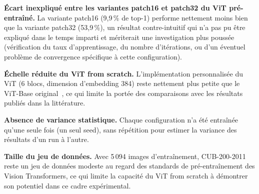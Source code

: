 \textbf{Écart inexpliqué entre les variantes patch16 et patch32 du ViT
pré-entraîné.} La variante patch16 (9{,}9\,\% de top-1) performe
nettement moins bien que la variante patch32 (53{,}9\,\%), un résultat
contre-intuitif qui n'a pas pu être expliqué dans le temps imparti et
mériterait une investigation plus poussée (vérification du taux
d'apprentissage, du nombre d'itérations, ou d'un éventuel problème de
convergence spécifique à cette configuration).

\textbf{Échelle réduite du ViT from scratch.} L'implémentation
personnalisée du ViT (6 blocs, dimension d'embedding 384) reste
nettement plus petite que le ViT-Base original~\cite{dosovitskiy2020vit},
ce qui limite la portée des comparaisons avec les résultats publiés
dans la littérature.

\textbf{Absence de variance statistique.} Chaque configuration n'a été
entraînée qu'une seule fois (un seul seed), sans répétition pour
estimer la variance des résultats d'un run à l'autre.

\textbf{Taille du jeu de données.} Avec 5\,094 images d'entraînement,
CUB-200-2011 reste un jeu de données modeste au regard des standards
de pré-entraînement des Vision Transformers, ce qui limite la capacité
du ViT from scratch à démontrer son potentiel dans ce cadre expérimental.